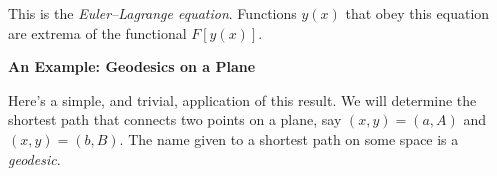 \documentclass[11pt,a4paper,twoside]{article}
\newcommand{\pnum}[1]{\makebox[0pt][r]{\scriptsize\textbf{[#1]}\hspace{0.7em}}}
\newif\ifstudynotes
\newcommand{\StudyNote}[2]{\ifstudynotes\begin{studyNote}[title={#1}]#2\end{studyNote}\fi}
\begin{document}
\StudyNote{複習註解：維持 (7.9) 不好嗎？}{

    \textbf{(7.9) 本身正確。}分部積分是為了從駐定條件讀出 $y$ 滿足的微分方程式。

    因為 $\delta y'=d(\delta y)/dx$，選定 $\delta y$ 後，$\delta y'$ 就跟著確定；

    不能把兩者當成可獨立選擇的變動，分別要求 $L_y=0$ 與 $L_{y'}=0$。



    分部積分並消去邊界項後，一階變化成為

    \[
        \delta F=\int_a^b G(x)\,\delta y(x)\,dx,
        \qquad G(x)=\frac{\partial L}{\partial y}
        -\frac{d}{dx}\left(\frac{\partial L}{\partial y'}\right).
    \]

    駐定要求它對\textbf{所有容許的變動}皆為零。若連續的 $G$ 在某處為正，

    可在附近選取一個非負、光滑且只在該小區域內非零的 $\delta y$，使積分大於零；

    為負時同理。因此必須 $G(x)=0$，這就是 (7.11)。



    \textbf{檢查例子：}若 $L=\tfrac12(y')^2$，固定端點下

    \[
        \delta F=\int_a^b y'\delta y'\,dx
            =[y'\delta y]_a^b-\int_a^b y''\delta y\,dx
        =-\int_a^b y''\delta y\,dx.
    \]

    正確條件是 $y''=0$，所以 $y=mx+c$。

    若誤把 (7.9) 中 $\delta y'$ 的係數直接設零，就會得到過強的條件 $y'=0$，排除斜直線。

}




\noindent\pnum{16}This is the \textit{Euler--Lagrange equation}. Functions $y(x)$ that obey this equation are extrema of the functional $F[y(x)]$.



\newpage

\begin{center}\large\bfseries An Example: Geodesics on a Plane\end{center}

\noindent\pnum{17}Here's a simple, and trivial, application of this result. We will determine the shortest path that connects two points on a plane, say $(x,y)=(a,A)$ and $(x,y)=(b,B)$. The name given to a shortest path on some space is a \textit{geodesic}.
\end{document}
